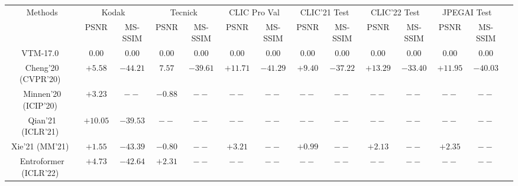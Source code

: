 \documentclass[sigconf]{acmart}
\begin{document}
\begin{table*}[t]
  \footnotesize
  \centering
  \begin{tabular}{@{}cccccccccccccc@{}}
  \toprule
  \multicolumn{1}{c|}{\multirow{2}{*}{Methods}}                            & \multicolumn{2}{c}{Kodak~\cite{kodak}}       & \multicolumn{2}{c}{Tecnick~\cite{asuni2014testimages}}   & \multicolumn{2}{c}{CLIC Pro Val~\cite{clic2020dataset}} & \multicolumn{2}{c}{CLIC'21 Test~\cite{clic2021dataset}} & \multicolumn{2}{c}{CLIC'22 Test~\cite{clic2022dataset}}  & \multicolumn{2}{c}{JPEGAI Test~\cite{jpegai}}   \\
  \multicolumn{1}{c|}{}                                                     & \multicolumn{1}{c}{PSNR} & \multicolumn{1}{c}{MS-SSIM} & \multicolumn{1}{c}{PSNR}& \multicolumn{1}{c}{MS-SSIM} & \multicolumn{1}{c}{PSNR}& \multicolumn{1}{c}{MS-SSIM}& \multicolumn{1}{c}{PSNR}& \multicolumn{1}{c}{MS-SSIM} & \multicolumn{1}{c}{PSNR}& \multicolumn{1}{c}{MS-SSIM} & \multicolumn{1}{c}{PSNR}& \multicolumn{1}{c}{MS-SSIM}\\ \midrule
  \multicolumn{1}{c|}{VTM-17.0~\cite{vtm2019}}                                        & $0.00$       & $0.00$         & $0.00$         & $0.00$  & $0.00$    & $0.00$    & $0.00$    & $0.00$  & $0.00$    &$0.00$    &$0.00$    &$0.00$ \\\midrule
  \multicolumn{1}{c|}{Cheng'20 (CVPR'20)~\cite{DBLP:conf/cvpr/ChengSTK20}}            & $+5.58$      & $-44.21$       & $7.57$       & $-39.61$ & $+11.71$ & $-41.29$ & $+9.40$ & $-37.22$ & $+13.29$ & $-33.40$ & $+11.95$ & $-40.03$ \\\midrule
  \multicolumn{1}{c|}{Minnen'20 (ICIP'20)~\cite{DBLP:conf/icip/MinnenS20}}            & $+3.23$      & $--$            & $-0.88$        & $--$     & $--$  & $--$  & $--$  & $--$  & $--$  & $--$  & $--$  & $--$ \\\midrule
  \multicolumn{1}{c|}{Qian'21 (ICLR'21)~\cite{DBLP:conf/iclr/QianTSLLSHJ21}}          & $+10.05$      & $-39.53$       & $--$       & $--$  & $--$       & $--$ & $--$       & $--$ & $--$       & $--$  & $--$  & $--$  \\\midrule
  \multicolumn{1}{c|}{Xie'21 (MM'21)~\cite{DBLP:conf/mm/XieCC21}}                     & $+1.55$      & $-43.39$       & $-0.80$       & $--$ &$+3.21$ &  $--$& $+0.99$  & $--$ & $+2.13$ &  $--$ & $+2.35$ & $--$\\\midrule
  \multicolumn{1}{c|}{Entroformer (ICLR'22)~\cite{DBLP:journals/corr/abs-2202-05492}} & $+4.73$      & $-42.64$       & $+2.31$              &$--$      &$--$  &$--$  &$--$  &$--$  &$--$   &$--$  &$--$  &$--$  \\\midrule

\end{tabular}
\end{table*}
\end{document}
